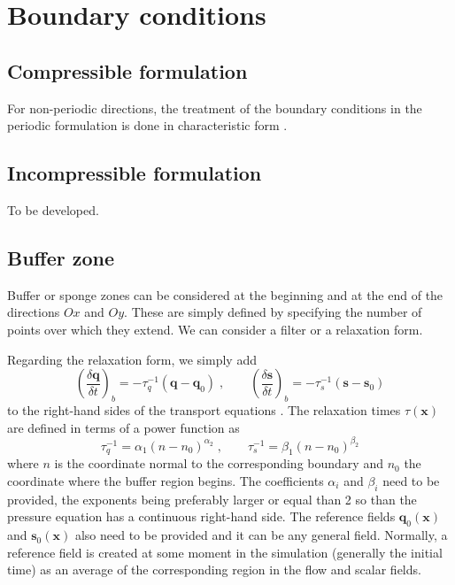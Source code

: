 \section{Boundary conditions}

\subsection{Compressible formulation}

For non-periodic directions, the treatment of the boundary conditions in the
periodic formulation is done in characteristic form
\citep{Thompson:1987,Thompson:1990,Lodato:2008}.

\subsection{Incompressible formulation}

To be developed.

\subsection{Buffer zone}\label{sec:buffer}

Buffer or sponge zones can be considered at the beginning and at the end of the
directions $Ox$ and $Oy$. These are simply defined by specifying the number of
points over which they extend. We can consider a filter or a relaxation form.

Regarding the relaxation form, we simply add
\begin{equation}
    \left(\frac{\delta \mathbf{q}}{\delta t}\right)_b=-\tau_q^{-1}(\mathbf{q}-\mathbf{q}_0)
    \;,\qquad
    \left(\frac{\delta \mathbf{s}}{\delta t}\right)_b=-\tau_s^{-1}(\mathbf{s}-\mathbf{s}_0)
\end{equation}
to the right-hand sides of the transport equations \citep{Hu:1996b}.  The
relaxation times $\tau(\mathbf{x})$ are defined in terms of a power function as
\begin{equation}
    \tau_q^{-1}=\alpha_1(n-n_0)^{\alpha_2} \;,\qquad
    \tau_s^{-1}=\beta_1(n-n_0)^{\beta_2}
\end{equation}
where $n$ is the coordinate normal to the corresponding boundary and $n_0$ the
coordinate where the buffer region begins. The coefficients $\alpha_i$ and
$\beta_i$ need to be provided, the exponents being preferably larger or equal
than 2 so than the pressure equation has a continuous right-hand side.  The
reference fields $\mathbf{q}_0(\mathbf{x})$ and $\mathbf{s}_0(\mathbf{x})$ also
need to be provided and it can be any general field. Normally, a reference field
is created at some moment in the simulation (generally the initial time) as an
average of the corresponding region in the flow and scalar fields.
